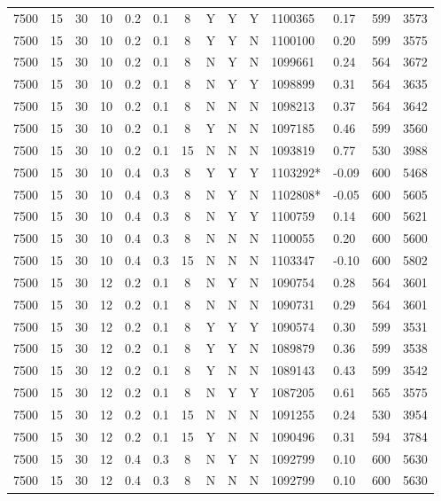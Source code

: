 \documentclass[a4paper, twocolumn, oneside, 10pt]{article}
\begin{document}
\begin{longtable}{|ccccccccccllll|}
	7500 & 15 & 30 & 10 & 0.2 & 0.1 & 8 & Y & Y & Y & 1100365 & 0.17 & 599 & 3573\\
	7500 & 15 & 30 & 10 & 0.2 & 0.1 & 8 & Y & Y & N & 1100100 & 0.20 & 599 & 3575\\
	7500 & 15 & 30 & 10 & 0.2 & 0.1 & 8 & N & Y & N & 1099661 & 0.24 & 564 & 3672\\
	7500 & 15 & 30 & 10 & 0.2 & 0.1 & 8 & N & Y & Y & 1098899 & 0.31 & 564 & 3635\\
	7500 & 15 & 30 & 10 & 0.2 & 0.1 & 8 & N & N & N & 1098213 & 0.37 & 564 & 3642\\
	7500 & 15 & 30 & 10 & 0.2 & 0.1 & 8 & Y & N & N & 1097185 & 0.46 & 599 & 3560\\
	7500 & 15 & 30 & 10 & 0.2 & 0.1 & 15 & N & N & N & 1093819 & 0.77 & 530 & 3988\\
	7500 & 15 & 30 & 10 & 0.4 & 0.3 & 8 & Y & Y & Y & 1103292* & -0.09 & 600 & 5468\\
	7500 & 15 & 30 & 10 & 0.4 & 0.3 & 8 & N & Y & N & 1102808* & -0.05 & 600 & 5605\\
	7500 & 15 & 30 & 10 & 0.4 & 0.3 & 8 & N & Y & Y & 1100759 & 0.14 & 600 & 5621\\
	7500 & 15 & 30 & 10 & 0.4 & 0.3 & 8 & N & N & N & 1100055 & 0.20 & 600 & 5600\\
	7500 & 15 & 30 & 10 & 0.4 & 0.3 & 15 & N & N & N & 1103347 & -0.10 & 600 & 5802\\
	7500 & 15 & 30 & 12 & 0.2 & 0.1 & 8 & N & Y & N & 1090754 & 0.28 & 564 & 3601\\
	7500 & 15 & 30 & 12 & 0.2 & 0.1 & 8 & N & N & N & 1090731 & 0.29 & 564 & 3601\\
	7500 & 15 & 30 & 12 & 0.2 & 0.1 & 8 & Y & Y & Y & 1090574 & 0.30 & 599 & 3531\\
	7500 & 15 & 30 & 12 & 0.2 & 0.1 & 8 & Y & Y & N & 1089879 & 0.36 & 599 & 3538\\
	7500 & 15 & 30 & 12 & 0.2 & 0.1 & 8 & Y & N & N & 1089143 & 0.43 & 599 & 3542\\
	7500 & 15 & 30 & 12 & 0.2 & 0.1 & 8 & N & Y & Y & 1087205 & 0.61 & 565 & 3575\\
	7500 & 15 & 30 & 12 & 0.2 & 0.1 & 15 & N & N & N & 1091255 & 0.24 & 530 & 3954\\
	7500 & 15 & 30 & 12 & 0.2 & 0.1 & 15 & Y & N & N & 1090496 & 0.31 & 594 & 3784\\
	7500 & 15 & 30 & 12 & 0.4 & 0.3 & 8 & N & Y & N & 1092799 & 0.10 & 600 & 5630\\
	7500 & 15 & 30 & 12 & 0.4 & 0.3 & 8 & N & N & N & 1092799 & 0.10 & 600 & 5630\\

\end{longtable}
\end{document}
